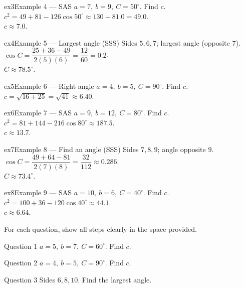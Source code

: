 \documentclass[11pt]{article}
\begin{document}
\begin{example}{ex3}{Example 4 --- SAS}
$a=7,\ b=9,\ C=50^\circ$. Find $c$.\soln $c^2=49+81-126\cos50^\circ\approx130-81.0=49.0$. \\ $c\approx7.0$.
\end{example}

\begin{example}{ex4}{Example 5 --- Largest angle (SSS)}
Sides $5,6,7$; largest angle (opposite $7$).\soln $\cos C=\dfrac{25+36-49}{2(5)(6)}=\dfrac{12}{60}=0.2$. \\ $C\approx78.5^\circ$.
\end{example}

\begin{example}{ex5}{Example 6 --- Right angle}
$a=4,\ b=5,\ C=90^\circ$. Find $c$.\soln $c=\sqrt{16+25}=\sqrt{41}\approx6.40$.
\end{example}

\begin{example}{ex6}{Example 7 --- SAS}
$a=9,\ b=12,\ C=80^\circ$. Find $c$.\soln $c^2=81+144-216\cos80^\circ\approx187.5$. \\ $c\approx13.7$.
\end{example}

\begin{example}{ex7}{Example 8 --- Find an angle (SSS)}
Sides $7,8,9$; angle opposite $9$.\soln $\cos C=\dfrac{49+64-81}{2(7)(8)}=\dfrac{32}{112}\approx0.286$. \\ $C\approx73.4^\circ$.
\end{example}

\begin{example}{ex8}{Example 9 --- SAS}
$a=10,\ b=6,\ C=40^\circ$. Find $c$.\soln $c^2=100+36-120\cos40^\circ\approx44.1$. \\ $c\approx6.64$.
\end{example}

\clearpage
{}
For each question, show all steps clearly in the space provided.

\begin{qbox}{Question 1}
$a=5,\ b=7,\ C=60^\circ$. Find $c$.\workspace{2.4cm}
\end{qbox}

\begin{qbox}{Question 2}
$a=4,\ b=5,\ C=90^\circ$. Find $c$.\workspace{2.4cm}
\end{qbox}

\begin{qbox}{Question 3}
Sides $6,8,10$. Find the largest angle.\workspace{2.4cm}
\end{qbox}
\end{document}

